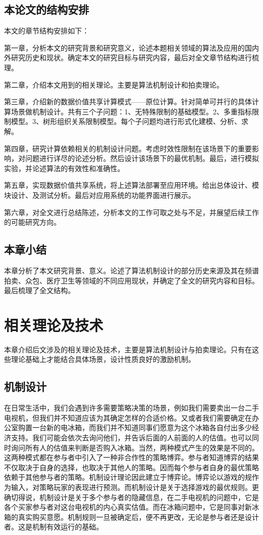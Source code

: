 \documentclass[promaster]{thesis-uestc}
\begin{document}
\section{本论文的结构安排}
本文的章节结构安排如下：

第一章，分析本文的研究背景和研究意义，论述本题相关领域的算法及应用的国内外研究历史和现状。确定本文的研究目标与研究内容，最后对全文章节结构进行梳理。

第二章，介绍本文用到的相关理论。主要是算法机制设计和拍卖理论。

第三章，介绍新的数据价值共享计算模式——原位计算。针对简单可并行的具体计算场景做机制设计。共有三个子问题：1、无特殊限制的基础模型。2、多重指标限制模型。3、树形组织关系限制模型。每个子问题均进行形式化建模、分析、求解。

第四章，研究计算依赖相关的机制设计问题。考虑时效性限制在该场景下的重要影响，对问题进行详尽的论述分析。然后设计该场景下的最优机制。最后，进行模拟实验，并论述算法的有效性和准确性。

第五章，实现数据价值共享系统，将上述算法部署至应用环境。给出总体设计、模块设计、及测试分析。最后对应用系统的功能界面进行展示。

第六章，对全文进行总结陈述，分析本文的工作可取之处与不足，并展望后续工作的可能研究方向。

\section{本章小结}
本章分析了本文研究背景、意义。论述了算法机制设计的部分历史来源及其在频谱拍卖、众包、医疗卫生等领域的不同应用现状，并确定了全文的研究内容和目标。最后梳理了全文结构。


\chapter{相关理论及技术}
本章介绍后文涉及的相关理论及技术，主要是算法机制设计与拍卖理论。只有在这些理论基础上才能结合具体场景，设计性质良好的激励机制。

\section{机制设计}
在日常生活中，我们会遇到许多需要策略决策的场景，例如我们需要卖出一台二手电视机，但我们并不知道应该为其确定怎样的合适价格。又或者我们需要确定在办公室购置一台新的电冰箱，而我们并不知道同事们愿意为这个冰箱各自付出多少经济支持。我们可能会依次去询问他们，并告诉后面的人前面的人的估值。也可以同时询问所有人的估值来判断是否购入冰箱。当然，两种模式产生的效果是不同的。这两种模式都在参与者中引入了一种非合作性的策略博弈。参与者知道博弈的结果不仅取决于自身的选择，也取决于其他人的策略。因而每个参与者自身的最优策略依赖于其他参与者的策略。机制设计理论因此建立于博弈论。博弈论以游戏的规作为输入，对策略玩家的表现进行预测。而机制设计是关于选择游戏的最优规则。更确切得说，机制设计是关于多个参与者的隐藏信息，在二手电视机的问题中，它是各个买家参与者对这台电视机的内心真实估值。而在冰箱问题中，它是同事对新冰箱的真实购买意愿。机制规则一旦被确定后，便不再更改，无论是参与者还是设计者。这是机制有效运行的基础。
\end{document}
